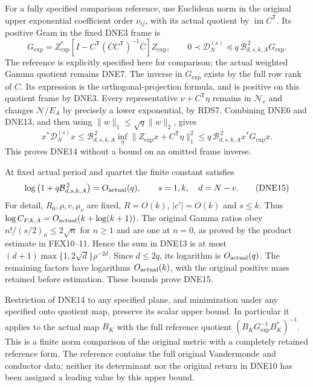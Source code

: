 \documentclass[11pt,a4paper]{article}
\begin{document}
For a fully specified comparison reference, use Euclidean
norm in the original upper exponential coefficient order
$\nu_{ij}$, with its actual quotient by
$\operatorname{im}C^{\mathsf T}$. Its positive Gram in the
fixed DNE3 frame is
\[
 G_{\exp}
 =Z_{\exp}^*
  \left[I-C^{\mathsf T}
     (\bar C C^{\mathsf T})^{-1}\bar C\right]Z_{\exp},
 \qquad
 0\prec\mathcal D_N^{(s)}
       \preceq q\,\mathcal B_{d,s,k,A}^{\,2}G_{\exp}.
 \tag{DNE14}
\]
The reference is explicitly specified here for comparison;
the actual weighted Gamma quotient remains DNE7.
The inverse in $G_{\exp}$ exists by the full row rank of
$C$. Its expression is the orthogonal-projection formula,
and is positive on this quotient frame by DNE3.
Every representative $\nu+C^{\mathsf T}\eta$ remains in
$\mathscr N_v$ and changes $\mathcal N/E_A$ by precisely a
lower exponential, by RDS7. Combining DNE6 and DNE13,
and then using $\|w\|_1\le\sqrt q\|w\|_2$, gives
\[
 x^*\mathcal D_N^{(s)}x
 \le\mathcal B_{d,s,k,A}^{\,2}
      \inf_\eta\|Z_{\exp}x+C^{\mathsf T}\eta\|_1^2
 \le q\,\mathcal B_{d,s,k,A}^{\,2}x^*G_{\exp}x.
\]
This proves DNE14 without a bound on an omitted frame inverse.

At fixed actual period and quartet the finite constant satisfies
\[
 \log\left(1+q\mathcal B_{d,s,k,A}^{\,2}\right)
       =O_{\rm actual}(q),\qquad s=1,k,\quad d=N-v.
 \tag{DNE15}
\]
For detail, $R_0,\rho,v,\mu_v$ are fixed, $R=O(k)$,
$|c'|=O(k)$ and $s\le k$. Thus
$\log C_{F,k,A}=O_{\rm actual}(k+\log(k+1))$.
The original Gamma ratios obey
$n!/(s/2)_n\le2\sqrt n$ for $n\ge1$ and are one at $n=0$,
as proved by the product estimate in FEX10--11. Hence the
sum in DNE13 is at most
$(d+1)\max\{1,2\sqrt d\}\rho^{-2d}$.
Since $d\le2q$, its logarithm is $O_{\rm actual}(q)$.
The remaining factors have logarithms $O_{\rm actual}(k)$,
with the original positive mass retained before estimation.
These bounds prove DNE15.

Restriction of DNE14 to any specified plane, and minimization
under any specified onto quotient map, preserve its scalar
upper bound. In particular it applies to the actual map $B_K$
with the full reference quotient
$(B_KG_{\exp}^{-1}B_K^*)^{-1}$.
This is a finite norm comparison of the original metric
with a completely retained reference form. The reference
contains the full original Vandermonde and conductor data;
neither its determinant nor the original return in DNE10
has been assigned a leading value by this upper bound.


\clearpage
\end{document}
